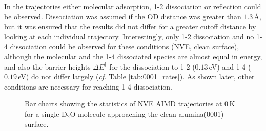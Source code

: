 \documentclass[11pt,DIV=13,BCOR=5mm,a4paper,headinclude]{scrbook}
\begin{document}
In the trajectories  either molecular adsorption, 1-2 dissociation or reflection could be observed.
Dissociation was assumed if the OD distance was greater than $1.3\,$\AA{}, but it was ensured that the results did not differ for a greater cutoff distance by looking at each individual trajectory.
Interestingly, only 1-2 dissociation and no 1-4 dissociation could be observed for these conditions (NVE, clean surface), although the molecular and the 1-4 dissociated species are almost equal in energy, and also the barrier heights $\Delta E^\ddagger$ for the dissociation to 1-2 ($0.13\,$eV) and 1-4 ($0.19\,$eV) do not differ largely (\textit{cf.} Table \ref{tab:0001_rates}).
As shown later, other conditions are necessary for reaching 1-4 dissociation.
\\

  \begin{figure}[h!]
\centering
 \quad
 \quad
\caption{Bar charts showing the statistics of NVE AIMD trajectories at $0\,$K for a single D$_2$O molecule approaching the clean alumina(0001) surface.
}
\end{figure}
\end{document}
